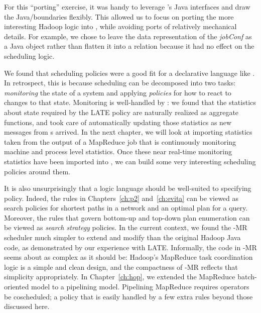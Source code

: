 For this ``porting'' exercise, it was handy to leverage \JOL's Java interfaces
and draw the Java/\OVERLOG boundaries flexibly.  This allowed us to focus on
porting the more interesting Hadoop logic into \OVERLOG, while avoiding ports of
relatively mechanical details.  For example, we chose to leave the data
representation of the \emph{jobConf} as a Java object rather than flatten it
into a relation because it had no effect on the scheduling logic.

We found that scheduling policies were a good fit for a declarative language
like \OVERLOG. In retrospect, this is because scheduling can be decomposed into
two tasks: \emph{monitoring} the state of a system and applying \emph{policies}
for how to react to changes to that state. Monitoring is well-handled by \OVERLOG: 
we found that the statistics about {\TT} state required by the LATE policy are naturally 
realized as aggregate functions, and \JOL took care of automatically updating those statistics 
as new messages from {\TT}s arrived. In the next chapter, we will look at importing statistics
taken from the output of a MapReduce job that is continuously monitoring machine and process level statistics.
Once these near real-time monitoring statistics have been imported into \JOL, we can build some 
very interesting scheduling policies around them.

It is also unsurprisingly that a logic language should be well-suited to specifying policy. Indeed, 
the rules in Chapters~\ref{ch:p2} and~\ref{ch:evita} can be viewed as search policies for shortest 
paths in a network and an optimal plan for a query. Moreover, the rules that govern bottom-up
and top-down plan enumeration can be viewed as {\em search strategy} policies. In the current context, we found 
the \BOOM-MR scheduler much simpler to extend and modify than the original Hadoop Java code, as demonstrated 
by our experience with LATE\@.  Informally, the \OVERLOG code in \BOOM-MR seems about as complex as it should be: 
Hadoop's MapReduce task coordination logic is a simple and clean design, and the compactness of \BOOM-MR reflects 
that simplicity appropriately. In Chapter~\ref{ch:hop}, we extended the MapReduce batch-oriented model to a pipelining 
model. Pipelining MapReduce requires operators be coscheduled; a policy that is easily handled by a few extra \OVERLOG 
rules beyond those discussed here.





